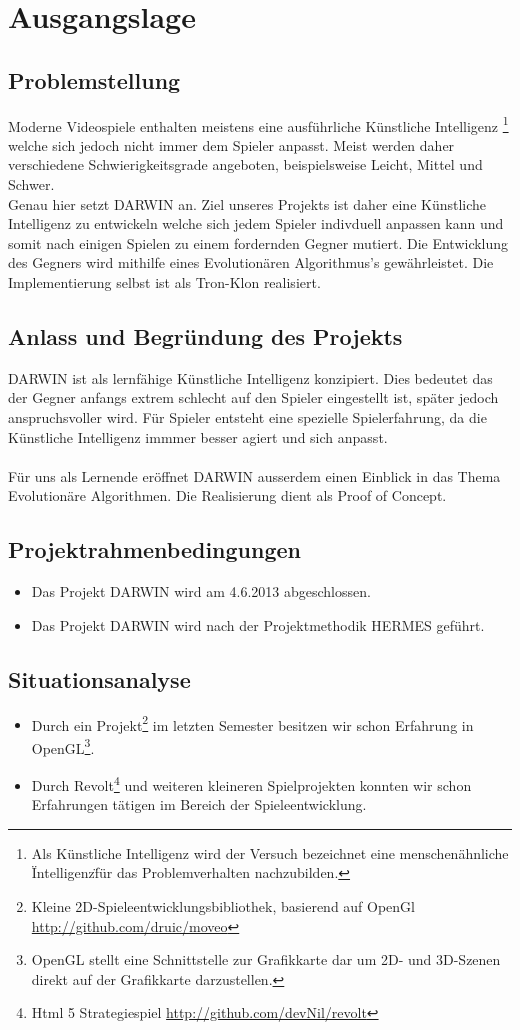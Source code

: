 \section{Ausgangslage}
\subsection{Problemstellung}
Moderne Videospiele enthalten meistens eine ausführliche Künstliche Intelligenz
\footnote{Als Künstliche Intelligenz wird der Versuch bezeichnet eine menschenähnliche \"Intelligenz\" für das Problemverhalten nachzubilden.} welche sich jedoch nicht immer dem Spieler anpasst. Meist werden daher verschiedene Schwierigkeitsgrade angeboten, beispielsweise Leicht, Mittel und Schwer.\\
Genau hier setzt DARWIN an. Ziel unseres Projekts ist daher eine Künstliche Intelligenz zu entwickeln welche sich jedem Spieler indivduell anpassen kann und somit nach einigen Spielen zu einem fordernden Gegner mutiert. Die Entwicklung des Gegners wird mithilfe eines Evolutionären Algorithmus's gewährleistet. Die Implementierung selbst ist als Tron-Klon realisiert.
\subsection{Anlass und Begründung des Projekts}
DARWIN ist als lernfähige Künstliche Intelligenz konzipiert. Dies bedeutet das der Gegner anfangs extrem schlecht auf den Spieler eingestellt ist, später jedoch anspruchsvoller wird. Für Spieler entsteht eine spezielle Spielerfahrung, da die Künstliche Intelligenz immmer besser agiert und sich anpasst. \\\\Für uns als Lernende eröffnet DARWIN ausserdem einen Einblick in das Thema Evolutionäre Algorithmen. Die Realisierung dient als Proof of Concept.
\subsection{Projektrahmenbedingungen}
\begin{itemize}
	\item Das Projekt DARWIN wird am 4.6.2013 abgeschlossen.
	\item Das Projekt DARWIN wird nach der Projektmethodik HERMES geführt.
\end{itemize}
\subsection{Situationsanalyse}
\begin{itemize}
	\item Durch ein Projekt\footnote{Kleine 2D-Spieleentwicklungsbibliothek, basierend auf OpenGl \url{http://github.com/druic/moveo}} im letzten Semester besitzen wir schon Erfahrung in
	OpenGL\footnote{OpenGL stellt eine Schnittstelle zur Grafikkarte dar um 2D- und 3D-Szenen direkt auf der Grafikkarte darzustellen.}.
	\item Durch Revolt\footnote{Html 5 Strategiespiel \url{http://github.com/devNil/revolt}} und weiteren kleineren Spielprojekten konnten wir schon Erfahrungen
	tätigen im Bereich der Spieleentwicklung.
\end{itemize}

